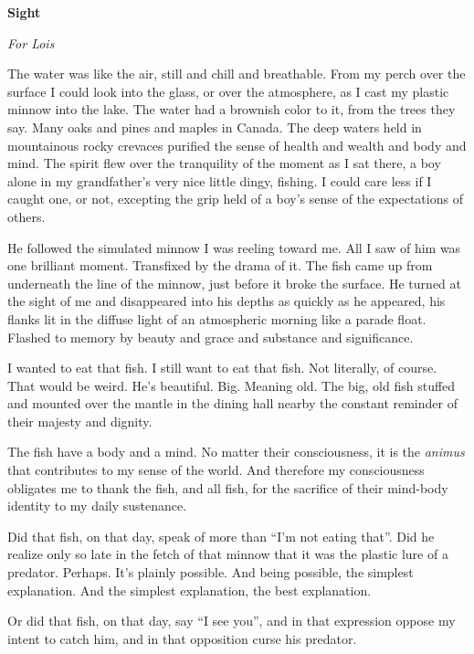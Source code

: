 

\centerline{\bf Sight}

\vfill
\break

\centerline{\it For Lois}

\vfill
\break

The water was like the air, still and chill and breathable.  From my
perch over the surface I could look into the glass, or over the
atmosphere, as I cast my plastic minnow into the lake.  The water had
a brownish color to it, from the trees they say.  Many oaks and pines
and maples in Canada.  The deep waters held in mountainous rocky
crevaces purified the sense of health and wealth and body and mind.
The spirit flew over the tranquility of the moment as I sat there, a
boy alone in my grandfather's very nice little dingy, fishing.  I
could care less if I caught one, or not, excepting the grip held of
a boy's sense of the expectations of others.

He followed the simulated minnow I was reeling toward me.  All I saw
of him was one brilliant moment.  Transfixed by the drama of it.  The
fish came up from underneath the line of the minnow, just before it
broke the surface.  He turned at the sight of me and disappeared into
his depths as quickly as he appeared, his flanks lit in the diffuse
light of an atmospheric morning like a parade float.  Flashed to
memory by beauty and grace and substance and significance.

I wanted to eat that fish.  I still want to eat that fish.  Not
literally, of course.  That would be weird.  He's beautiful.  Big.
Meaning old.  The big, old fish stuffed and mounted over the mantle in
the dining hall nearby the constant reminder of their majesty and
dignity.  

The fish have a body and a mind.  No matter their consciousness, it is
the {\it animus} that contributes to my sense of the world.  And
therefore my consciousness obligates me to thank the fish, and all
fish, for the sacrifice of their mind-body identity to my daily
sustenance.

Did that fish, on that day, speak of more than ``I'm not eating
that''.  Did he realize only so late in the fetch of that minnow that
it was the plastic lure of a predator.  Perhaps.  It's plainly
possible.  And being possible, the simplest explanation.  And the
simplest explanation, the best explanation.

Or did that fish, on that day, say ``I see you'', and in that
expression oppose my intent to catch him, and in that opposition curse
his predator.

\bye
